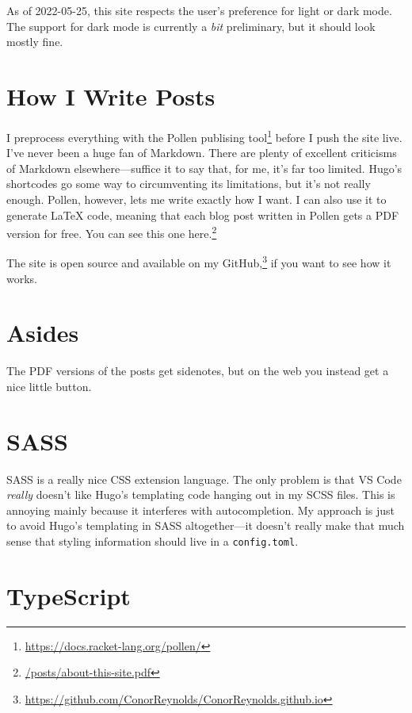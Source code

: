 \documentclass[a4paper,11pt,oneside,article]{memoir}
\begin{document}
As of 2022-05-25, this site respects the user's preference for light or dark mode. The support for dark mode is currently a \emph{bit} preliminary, but it should look mostly fine.

\chapter[How I Write Posts]{How I Write Posts}

I preprocess everything with the Pollen publising tool\footnote{\url{https://docs.racket-lang.org/pollen/}} before I push the site live. I've never been a huge fan of Markdown. There are plenty of excellent criticisms of Markdown elsewhere—suffice it to say that, for me, it's far too limited. Hugo's shortcodes go some way to circumventing its limitations, but it's not really enough. Pollen, however, lets me write exactly how I want. I can also use it to generate \LaTeX{} code, meaning that each blog post written in Pollen gets a PDF version for free. You can see this one here.\footnote{\url{/posts/about-this-site.pdf}}

The site is open source and available on my GitHub,\footnote{\url{https://github.com/ConorReynolds/ConorReynolds.github.io}} if you want to see how it works.

\chapter[Asides]{Asides}

The PDF versions of the posts get sidenotes, but on the web you instead get a nice little button. 

\chapter[SASS]{SASS}

SASS is a really nice CSS extension language. The only problem is that VS Code \emph{really} doesn't like Hugo's templating code hanging out in my SCSS files. This is annoying mainly because it interferes with autocompletion. My approach is just to avoid Hugo's templating in SASS altogether—it doesn't really make that much sense that styling information should live in a \texttt{config.toml}.

\chapter[TypeScript]{TypeScript}
\end{document}
